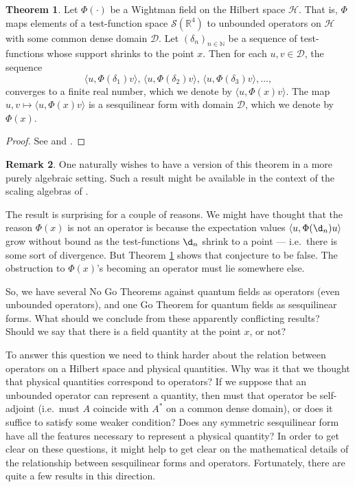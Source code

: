 \documentclass[11pt]{article}
\theoremstyle{definition}
\newtheorem{thm}{Theorem}[section]
\theoremstyle{definition}
\newtheorem{note}[thm]{Remark}
\theoremstyle{remark}
\def\2#1{{\mathcal #1}}
\def\7#1{{\mathbb #1}}
\begin{document}
\begin{thm} Let $\Phi (\cdot )$ be a Wightman field on the Hilbert
  space $\2H$.  That is, $\Phi $ maps elements of a test-function
  space $\2S (\7R ^4)$ to unbounded operators on $\2H$ with some
  common dense domain $\2D$.  Let $(\delta _n)_{n\in \7N}$ be a
  sequence of test-functions whose support shrinks to the point $x$.
  Then for each $u,v\in \2D$, the sequence
  $$ \langle u,\Phi (\delta _1)v\rangle , \, \langle u,\Phi (\delta _2)v\rangle ,\,\langle u,\Phi (\delta _3)v\rangle , \dots ,$$
  converges to a finite real number, which we denote by $\langle
  u,\Phi (x)v\rangle $.  The map $u,v\mapsto \langle u,\Phi
  (x)v\rangle$ is a sesquilinear form with domain $\2D$, which we
  denote by $\Phi (x)$.  \label{russ}
\end{thm}

\begin{proof} See \cite[p.\ 332]{russ} and
  \cite{wollenberg86a,wollenberg86b}.  \end{proof}

\begin{note} One naturally wishes to have a version of this theorem in
  a more purely algebraic setting.  Such a result might be available
  in the context of the scaling algebras of \cite{scaling,bucky}.
\end{note}

The result is surprising for a couple of reasons.  We might have
thought that the reason $\Phi (x)$ is not an operator is because the
expectation values $\langle u,\Phi (\d _n)u\rangle $ grow without
bound as the test-functions $\d _n$ shrink to a point --- i.e.\ there
is some sort of divergence.  But Theorem \ref{russ} shows that
conjecture to be false.  The obstruction to $\Phi (x)$'s becoming an
operator must lie somewhere else.

So, we have several No Go Theorems against quantum fields as operators
(even unbounded operators), and one Go Theorem for quantum fields as
sesquilinear forms.  What should we conclude from these apparently
conflicting results?  Should we say that there is a field quantity at
the point $x$, or not?

To answer this question we need to think harder about the relation
between operators on a Hilbert space and physical quantities.  Why was
it that we thought that physical quantities correspond to operators?
If we suppose that an unbounded operator can represent a quantity,
then must that operator be self-adjoint (i.e.\ must $A$ coincide with
$A^*$ on a common dense domain), or does it suffice to satisfy some
weaker condition?  Does any symmetric sesquilinear form have all the
features necessary to represent a physical quantity?  In order to get
clear on these questions, it might help to get clear on the
mathematical details of the relationship between sesquilinear forms
and operators.  Fortunately, there are quite a few results in this
direction.
\end{document}
